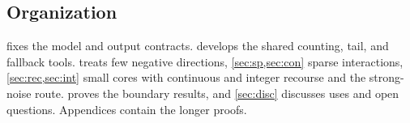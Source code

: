 \subsection{Organization}\label{sec:intro:organization}

 fixes the model and output contracts. 
develops the shared counting, tail, and fallback tools.  treats
few negative directions, \cref{sec:sp,sec:con} sparse interactions,
\cref{sec:rec,sec:int} small cores with continuous and integer recourse and
the strong-noise route.  proves the boundary results, and
\cref{sec:disc} discusses uses and open questions. Appendices contain the
longer proofs.
